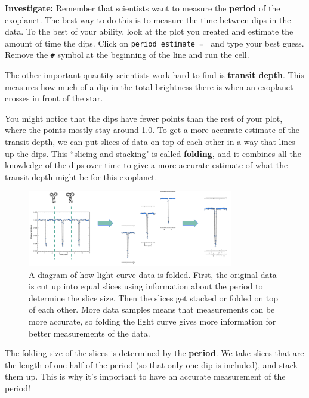 \documentclass[14pt]{article}
\begin{document}
\textbf{Investigate:} Remember that scientists want to measure the \textbf{period} of the exoplanet. The best way to do this is to measure the time between dips in the data. To the best of your ability, look at the plot you created and estimate the amount of time the dips. Click on \texttt{period\_estimate = } and type your best guess. Remove the \texttt{\#} symbol at the beginning of the line and run the cell.

\vspace{2mm}

\noindent The other important quantity scientists work hard to find is \textbf{transit depth}. This measures how much of a dip in the total brightness there is when an exoplanet crosses in front of the star.

\vspace{2mm}

\noindent You might notice that the dips have fewer points than the rest of your plot, where the points mostly stay around 1.0. To get a more accurate estimate of the transit depth, we can put slices of data on top of each other in a way that lines up the dips. This ``slicing and stacking" is called \textbf{folding}, and it combines all the knowledge of the dips over time to give a more accurate estimate of what the transit depth might be for this exoplanet.

\begin{figure}[hb!]
    \centering
    \includegraphics[width=0.8\textwidth]{folding_example.png}
    \caption{A diagram of how light curve data is folded. First, the original data is cut up into equal slices using information about the period to determine the slice size. Then the slices get stacked or folded on top of each other. More data samples means that measurements can be more accurate, so folding the light curve gives more information for better measurements of the data.}
    \label{fig:data_example}
\end{figure}

\noindent The folding size of the slices is determined by the \textbf{period}. We take slices that are the length of one half of the period (so that only one dip is included), and stack them up. This is why it's important to have an accurate measurement of the period!
\end{document}
